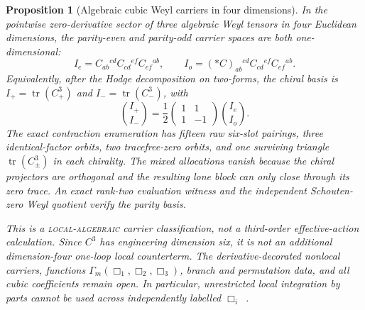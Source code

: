 \documentclass[11pt]{article}
\newtheorem{proposition}[theorem]{Proposition}
\theoremstyle{definition}
\theoremstyle{remark}
\begin{document}
\begin{proposition}[Algebraic cubic Weyl carriers in four dimensions]
In the pointwise zero-derivative sector of three algebraic Weyl tensors in
four Euclidean dimensions, the parity-even and parity-odd carrier spaces are
both one-dimensional:
\[
 I_e=C_{ab}{}^{cd}C_{cd}{}^{ef}C_{ef}{}^{ab},
 \qquad
 I_o=({*C})_{ab}{}^{cd}C_{cd}{}^{ef}C_{ef}{}^{ab}.
\]
Equivalently, after the Hodge decomposition on two-forms, the chiral basis is
\(
 I_+=\operatorname{tr}(C_+^3)
\)
and
\(
 I_-=\operatorname{tr}(C_-^3)
\), with
\[
 \binom{I_+}{I_-}
 =\frac12\begin{pmatrix}1&1\\1&-1\end{pmatrix}
 \binom{I_e}{I_o}.
\]
The exact contraction enumeration has fifteen raw six-slot pairings, three
identical-factor orbits, two tracefree-zero orbits, and one surviving triangle
\(\operatorname{tr}(C_\pm^3)\) in each chirality.  The mixed allocations
vanish because the chiral projectors are orthogonal and the resulting lone
block can only close through its zero trace.
An exact rank-two evaluation witness and the independent Schouten-zero Weyl
quotient verify the parity basis.

This is a \textnormal{\textsc{local-algebraic}} carrier classification, not a third-order
effective-action calculation.  Since \(C^3\) has engineering dimension six,
it is not an additional dimension-four one-loop local counterterm.  The
derivative-decorated nonlocal carriers, functions
\(\Gamma_m(\Box_1,\Box_2,\Box_3)\), branch and permutation data, and all
cubic coefficients remain open.  In particular, unrestricted local
integration by parts cannot be used across independently labelled
\(\Box_i\)~\cite{BarvinskyCPT,BarvinskyWachowski}.
\end{proposition}
\end{document}
